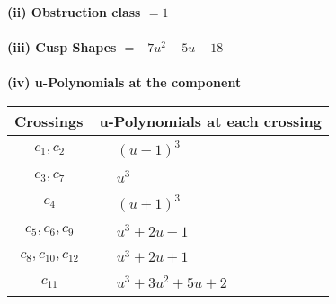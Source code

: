 \documentclass[1p]{elsarticle_modified}
\theoremstyle{definition}
\begin{document}
\flushleft \textbf{(ii) Obstruction class $= 1$}\\~\\
\flushleft \textbf{(iii) Cusp Shapes $= -7 u^2-5 u-18$}\\~\\
\newpage\renewcommand{\arraystretch}{1}
\flushleft \textbf{(iv) u-Polynomials at the component}\newline \\
\begin{tabular}{m{50pt}|m{274pt}}
Crossings & \hspace{64pt}u-Polynomials at each crossing \\
\hline $$\begin{aligned}c_{1},c_{2}\end{aligned}$$&$\begin{aligned}
&(u-1)^3
\end{aligned}$\\
\hline $$\begin{aligned}c_{3},c_{7}\end{aligned}$$&$\begin{aligned}
&u^3
\end{aligned}$\\
\hline $$\begin{aligned}c_{4}\end{aligned}$$&$\begin{aligned}
&(u+1)^3
\end{aligned}$\\
\hline $$\begin{aligned}c_{5},c_{6},c_{9}\end{aligned}$$&$\begin{aligned}
&u^3+2 u-1
\end{aligned}$\\
\hline $$\begin{aligned}c_{8},c_{10},c_{12}\end{aligned}$$&$\begin{aligned}
&u^3+2 u+1
\end{aligned}$\\
\hline $$\begin{aligned}c_{11}\end{aligned}$$&$\begin{aligned}
&u^3+3 u^2+5 u+2
\end{aligned}$\\
\hline
\end{tabular}\\~\\
\newpage\renewcommand{\arraystretch}{1}
\end{document}
